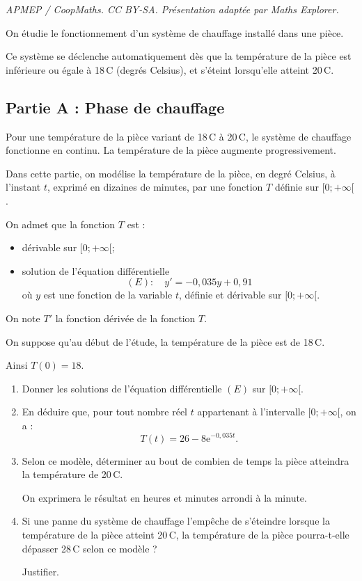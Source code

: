 \documentclass[10pt]{article}
\providecommand{\e}{{\mathrm{e}}}
\begin{document}
\noindent\textit{APMEP / CoopMaths. CC BY-SA. Présentation adaptée par Maths Explorer.}\par\medskip
On étudie le fonctionnement d'un système de chauffage installé dans une pièce.

Ce système se déclenche automatiquement dès que la température de la pièce est inférieure ou égale à 18\,\textdegree{}C (degrés Celsius), et s'éteint lorsqu'elle atteint 20\,\textdegree{}C.

	\subsection*{Partie A : Phase de chauffage}
		Pour une température de la pièce variant de 18\,\textdegree{}C à 20\,\textdegree{}C, le système de chauffage fonctionne en continu. La température de la pièce augmente progressivement.

		Dans cette partie, on modélise la température de la pièce, en degré Celsius, à l'instant $t$, exprimé en dizaines de minutes, par une fonction $T$ définie sur $[0 ;+\infty[$.

		On admet que la fonction $T$ est :
		\begin{itemize}[label={\textbullet~}]
			\item dérivable sur $[0 ;+\infty[$;
			\item solution de l'équation différentielle
			\[(E): \quad y'=-0,035 y+0,91\]
			où $y$ est une fonction de la variable $t$, définie et dérivable sur $[0 ;+\infty[$.
		\end{itemize}

		On note $T'$ la fonction dérivée de la fonction $T$.

		On suppose qu'au début de l'étude, la température de la pièce est de 18\,\textdegree{}C.

		Ainsi \quad $T(0)=18$.

		\begin{enumerate}
			\item Donner les solutions de l'équation différentielle $(E)$ sur $[0 ; +\infty[$.

			\item En déduire que, pour tout nombre réel $t$ appartenant à l'intervalle $[0 ;+\infty[$, on a :
			\[ T(t)=26-8 \e^{-0,035 t}.\]

			\item Selon ce modèle, déterminer au bout de combien de temps la pièce atteindra la température de 20\,\textdegree{}C.

			On exprimera le résultat en heures et minutes arrondi à la minute.

			\item Si une panne du système de chauffage l'empêche de s'éteindre lorsque la température de la pièce atteint 20\,\textdegree{}C, la température de la pièce pourra-t-elle dépasser 28\,\textdegree{}C selon ce modèle ?

			Justifier.
		\end{enumerate}
\end{document}

